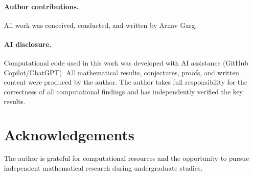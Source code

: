 \documentclass[12pt]{article}
\theoremstyle{plain}
\theoremstyle{definition}
\theoremstyle{remark}
\theoremstyle{definition}
\begin{document}
\paragraph{Author contributions.}
All work was conceived, conducted, and written by Arnav Garg.

\paragraph{AI disclosure.}
Computational code used in this work was developed with AI assistance
(GitHub Copilot/ChatGPT). All mathematical results, conjectures, proofs,
and written content were produced by the author. The author takes full
responsibility for the correctness of all computational findings and has
independently verified the key results.


\section*{Acknowledgements}

The author is grateful for computational resources and the
opportunity to pursue independent mathematical research during
undergraduate studies.

\end{document}
